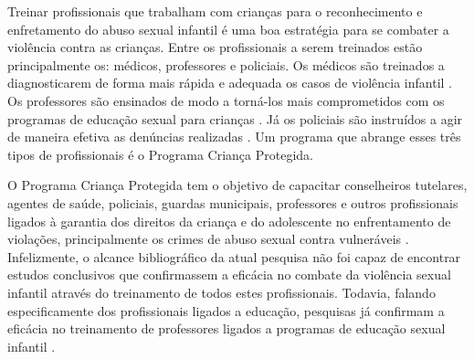 Treinar profissionais que trabalham com crianças para o reconhecimento e enfretamento do abuso sexual infantil é uma boa estratégia para se combater a violência contra as crianças. Entre os profissionais a serem treinados estão principalmente os: médicos, professores e policiais. Os médicos são treinados a diagnosticarem de forma mais rápida e adequada os casos de violência infantil \cite{de2012violencia}. Os professores são ensinados de modo a torná-los mais comprometidos com os programas de educação sexual para crianças \cite{dip2016advancing}. Já os policiais são instruídos a agir de maneira efetiva as denúncias realizadas \cite{pelisoli2010prevenccao}. 
Um programa que abrange esses três tipos de profissionais é o Programa Criança Protegida. 

\vspace{-0.1cm}


O Programa Criança Protegida tem o objetivo de capacitar conselheiros tutelares, agentes de saúde, policiais, guardas municipais, professores e outros profissionais ligados à garantia dos direitos da criança e do adolescente no enfrentamento de violações, principalmente os crimes de abuso sexual contra vulneráveis \cite{humanos2019ibero}. Infelizmente, o alcance bibliográfico da atual pesquisa não foi capaz de encontrar estudos conclusivos que confirmassem a eficácia no combate da violência sexual infantil através do treinamento de todos estes profissionais. Todavia, falando especificamente dos profissionais ligados a educação, pesquisas já confirmam a eficácia no treinamento de professores ligados a programas de educação sexual infantil \cite{dip2016advancing}. 







